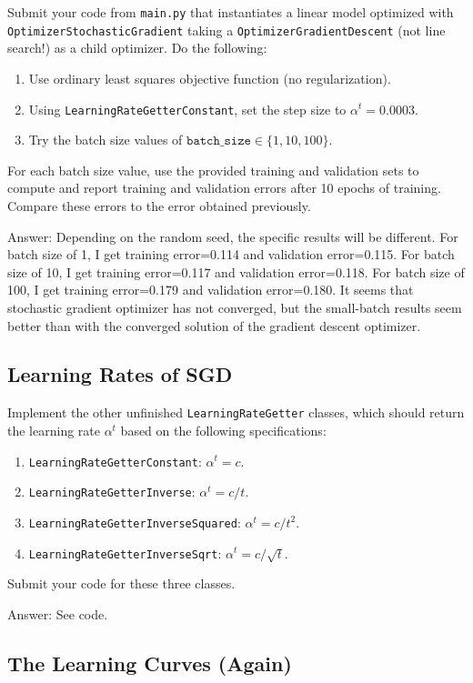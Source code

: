 \documentclass{article}
\def\ans#1{\par\gre{Answer: #1}}
\def\blu#1{{\color{blu}#1}}
\def\gre#1{{\color{gre}#1}}
\def\enum#1{\begin{enumerate}#1\end{enumerate}}
\begin{document}
\blu{
	Submit your code from \texttt{main.py} that instantiates a linear model optimized with \texttt{OptimizerStochasticGradient} taking a \texttt{OptimizerGradientDescent} (not line search!) as a child optimizer. Do the following:
	\enum{
		\item Use ordinary least squares objective function (no regularization).
		\item Using \texttt{LearningRateGetterConstant}, set the step size to $\alpha^t = 0.0003$.
		\item Try the batch size values of $\texttt{batch\_size} \in \{1, 10, 100\}$.
	}
	For each batch size value, use the provided training and validation sets to compute and report training and validation errors after 10 epochs of training. Compare these errors to the error obtained previously.
}

\ans{
	Depending on the random seed, the specific results will be different. For batch size of 1, I get training error=0.114 and validation error=0.115. For batch size of 10, I get training error=0.117 and validation error=0.118. For batch size of 100, I get training error=0.179 and validation error=0.180. It seems that stochastic gradient optimizer has not converged, but the small-batch results seem better than with the converged solution of the gradient descent optimizer.
}

\subsection{Learning Rates of SGD}

\blu{
	Implement the other unfinished \texttt{LearningRateGetter} classes, which should return the learning rate $\alpha^t$ based on the following 	
	specifications:
	\enum{
		\item \texttt{LearningRateGetterConstant}: $\alpha^t = c$.
		\item \texttt{LearningRateGetterInverse}: $\alpha^t = c/t$.
		\item \texttt{LearningRateGetterInverseSquared}: $\alpha^t = c/t^2$.
		\item \texttt{LearningRateGetterInverseSqrt}: $\alpha^t = c/\sqrt{t}$.
	}
	Submit your code for these three classes.
}

\ans{
See code.
}

\subsection{The Learning Curves (Again)}
\end{document}
